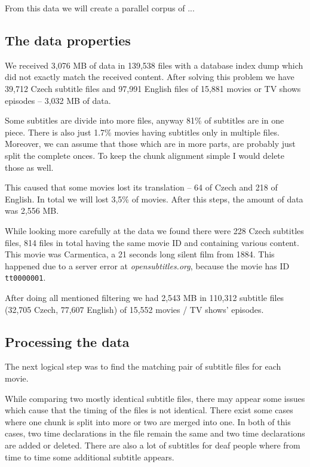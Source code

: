 From this data we will create a parallel corpus of ...

\subsection{The data properties}

We received 3,076 MB of data in 139,538 files with a database index dump which did not exactly match the received content. After solving this problem we have 39,712 Czech subtitle files and 97,991 English files of 15,881 movies or TV shows episodes -- 3,032 MB of data.

Some subtitles are divide into more files, anyway 81\% of subtitles are in one piece. There is also just 1.7\% movies having subtitles only in multiple files. Moreover, we can assume that those which are in more parts, are probably just split the complete onces. To keep the chunk alignment simple I would delete those as well.

This caused that some movies lost its translation -- 64
of Czech and 218 of English. In total we will lost 3,5\% of movies. After this steps, the amount of data was 2,556 MB.

While looking more carefully at the data we found there were 228 Czech subtitles files, 814 files in total having the same movie ID and containing various content. This movie was Carmentica, a 21 seconds long silent film from 1884. This happened due to a server error at \emph{opensubtitles.org}, because the movie has ID {\tt tt0000001}.

After doing all mentioned filtering we had 2,543 MB in 110,312 subtitle files (32,705 Czech, 77,607 English) of 15,552 movies / TV shows' episodes.

\subsection{Processing the data}

The next logical step was to find the matching pair of subtitle files for each movie. 

While comparing two mostly identical subtitle files, there may appear some issues which cause that the timing of the files is not identical. There exist some cases where one chunk is split into more or two are merged into one. In both of this cases, two time declarations in the file remain the same and two time declarations are added or deleted. There are also a lot of subtitles for deaf people where from time to time some additional subtitle appears. 

